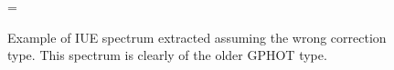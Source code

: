 \begin{figure} %
\epsfxsize=\figwidth
\setlength{\cen}{(\textwidth / 2) - (\epsfxsize / 2)}
\hspace{\cen}
\caption[Example of IUE spectrum extracted assuming the wrong
correction type] {\fcfont Example of IUE spectrum extracted assuming
the wrong correction type. This spectrum is clearly of the older GPHOT
type.}
\label{fig:iue:red}
\end{figure}   %



